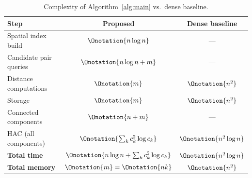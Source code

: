 \begin{table}[t]
\caption{Complexity of Algorithm~\ref{alg:main} vs.\ dense baseline.}
\label{tab:complexity}
\small
\begin{tabular}{lcc}
\toprule
\textbf{Step} & \textbf{Proposed} & \textbf{Dense baseline} \\
\midrule
Spatial index build    & $\Onotation{n \log n}$ & --- \\
Candidate pair queries & $\Onotation{n \log n + m}$ & --- \\
Distance computations  & $\Onotation{m}$ & $\Onotation{n^2}$ \\
Storage                & $\Onotation{m}$ & $\Onotation{n^2}$ \\
Connected components   & $\Onotation{n + m}$ & --- \\
HAC (all components)   & $\Onotation{\sum_k c_k^2 \log c_k}$ & $\Onotation{n^2 \log n}$ \\
\midrule
\textbf{Total time}    & $\Onotation{n \log n + \sum_k c_k^2 \log c_k}$ & $\Onotation{n^2 \log n}$ \\
\textbf{Total memory}  & $\Onotation{m} = \Onotation{nk}$ & $\Onotation{n^2}$ \\
\bottomrule
\end{tabular}
\end{table}